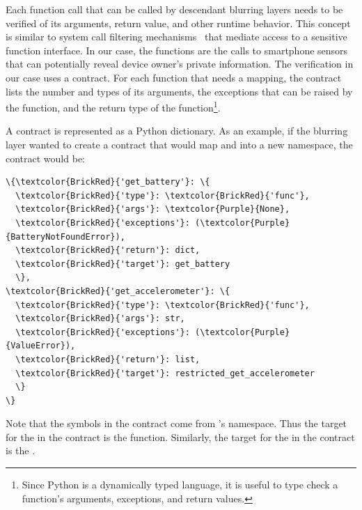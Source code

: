 %
Each function call that can be called by descendant blurring
layers needs to be verified of its arguments, return value, and 
other runtime behavior. This concept is similar to system call filtering
mechanisms~\cite{acharya2000mapbox, fraser2000hardening} 
that mediate access to a sensitive function interface. In our case, 
the functions are the calls to smartphone sensors that 
can potentially reveal device owner's private information. The 
verification in our case uses a contract. For each function that needs a 
mapping, the contract lists the number 
and types of its arguments, the exceptions that can be raised 
by the function, and the return type of the function\footnote{Since 
Python is a dynamically typed language, it is useful to type check 
a function's arguments, exceptions, and return values.}.

A contract is represented as a Python dictionary. As an example, if 
the blurring layer  wanted to create a contract that would map
 and  into 
a new namespace, the contract would be: 

\begin{Verbatim}
\{\textcolor{BrickRed}{'get_battery'}: \{
  \textcolor{BrickRed}{'type'}: \textcolor{BrickRed}{'func'},
  \textcolor{BrickRed}{'args'}: \textcolor{Purple}{None}, 
  \textcolor{BrickRed}{'exceptions'}: (\textcolor{Purple}{BatteryNotFoundError}), 
  \textcolor{BrickRed}{'return'}: dict,
  \textcolor{BrickRed}{'target'}: get_battery
  \}, 
\textcolor{BrickRed}{'get_accelerometer'}: \{
  \textcolor{BrickRed}{'type'}: \textcolor{BrickRed}{'func'},
  \textcolor{BrickRed}{'args'}: str, 
  \textcolor{BrickRed}{'exceptions'}: (\textcolor{Purple}{ValueError}), 
  \textcolor{BrickRed}{'return'}: list,
  \textcolor{BrickRed}{'target'}: restricted_get_accelerometer
  \}
\}
\end{Verbatim} 

Note that the symbols in the contract come from 's 
namespace. Thus the target for the  in the 
contract is the  function. Similarly, the 
target for the  in the contract is the 
.

